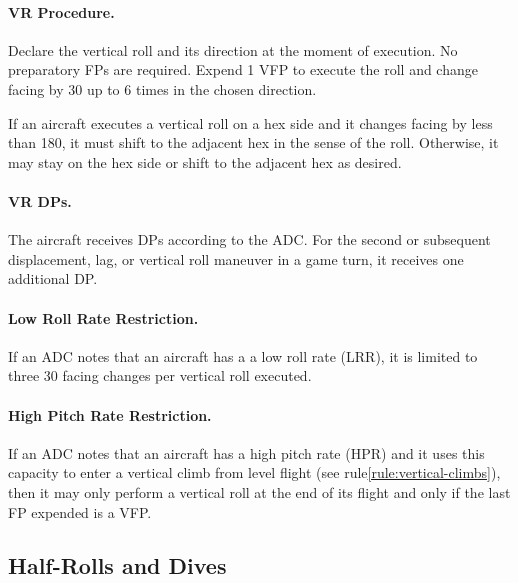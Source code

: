 {\paragraph{VR Procedure.} Declare the vertical roll and its direction at the moment of execution. No preparatory FPs are required. Expend 1 VFP to execute the roll and change facing by 30{\deg} up to 6 times in the chosen direction. 

If an aircraft executes a vertical roll on a hex side and it changes facing by less than 180{\deg}, it must shift to the adjacent hex in the sense of the roll. Otherwise, it may stay on the hex side or shift to the adjacent hex as desired.

\paragraph{VR DPs.} The aircraft receives DPs according to the ADC. For the second or subsequent displacement, lag, or vertical roll maneuver in a game turn, it receives one additional DP.

\paragraph{Low Roll Rate Restriction.} If an ADC notes that an aircraft has a
a low roll rate (LRR), it is limited to three 30{\deg} facing changes per vertical roll executed.

\paragraph{High Pitch Rate Restriction.} If an ADC notes that an aircraft has a high pitch rate (HPR) and it uses this capacity to enter a vertical climb from level flight (see rule\ref{rule:vertical-climbs}), then it may only perform a vertical roll at the end of its flight and only if the last FP expended is a VFP.
}
\subsection{Half-Rolls and Dives}
\label{rule:half-rolls-and-dives}


